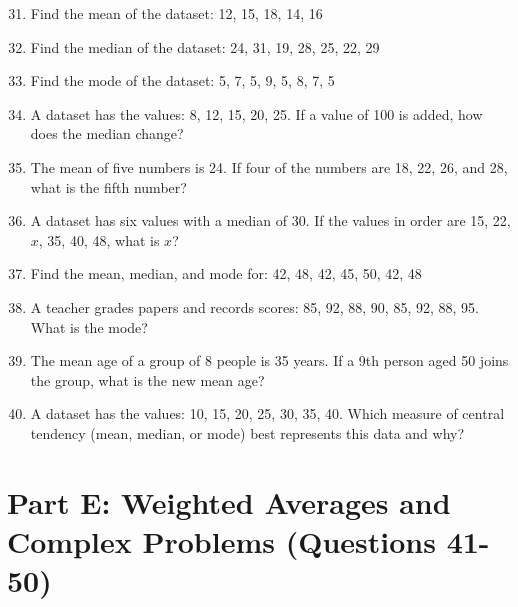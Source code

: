 \documentclass[12pt,a4paper]{article}
\begin{document}
\begin{enumerate}
\setcounter{enumi}{30}

\item Find the mean of the dataset: 12, 15, 18, 14, 16

\item Find the median of the dataset: 24, 31, 19, 28, 25, 22, 29

\item Find the mode of the dataset: 5, 7, 5, 9, 5, 8, 7, 5

\item A dataset has the values: 8, 12, 15, 20, 25. If a value of 100 is added, how does the median change?

\item The mean of five numbers is 24. If four of the numbers are 18, 22, 26, and 28, what is the fifth number?

\item A dataset has six values with a median of 30. If the values in order are 15, 22, $x$, 35, 40, 48, what is $x$?

\item Find the mean, median, and mode for: 42, 48, 42, 45, 50, 42, 48

\item A teacher grades papers and records scores: 85, 92, 88, 90, 85, 92, 88, 95. What is the mode?

\item The mean age of a group of 8 people is 35 years. If a 9th person aged 50 joins the group, what is the new mean age?

\item A dataset has the values: 10, 15, 20, 25, 30, 35, 40. Which measure of central tendency (mean, median, or mode) best represents this data and why?

\end{enumerate}

\section{Part E: Weighted Averages and Complex Problems (Questions 41-50)}
\end{document}

